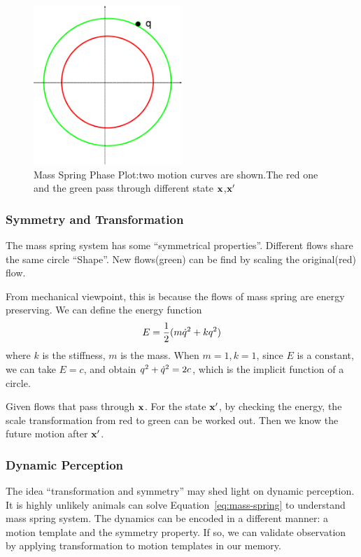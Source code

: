 \begin{figure}[!htbp]
  \begin{center}
     \includegraphics[width=0.5\textwidth]{MassSpringPhasePlot}
    \caption{Mass Spring Phase Plot:two motion curves are shown.The red one and the green pass through different state $\mathbf{x}$,$\mathbf{x}'$}
    \label{fig:massSpringPhasePlot}  
  \end{center}
\end{figure}

\subsubsection*{Symmetry and Transformation}

The mass spring system has some ``symmetrical properties''.
Different flows share the same circle ``Shape''.
New flows(green) can be find by scaling the original(red) flow.

From mechanical viewpoint, this is because the flows of mass spring are energy preserving.
We can define the energy function
\[
E=\frac{1}{2}(m\dot{q}^2+kq^2)
\]
where $k$ is the stiffness, $m$ is the mass.
When $m=1,k=1$, since $E$ is a constant, we can take $E=c$,
and obtain $q^2+\dot{q}^2=2c$, which is the implicit function of a circle.

Given flows that pass through  $\mathbf{x}$.
For the state $\mathbf{x}'$, by checking the energy, the scale transformation from red to green can be worked out.
Then we know the future motion after $\mathbf{x}'$.


\subsubsection*{Dynamic Perception}

The idea ``transformation and symmetry'' may shed light on dynamic perception. 
It is highly unlikely animals can solve Equation~\ref{eq:mass-spring} to understand mass spring system.
The dynamics can be encoded in a different manner: a motion template and the symmetry property.
If so, we can validate observation by applying transformation to motion templates in our memory.



